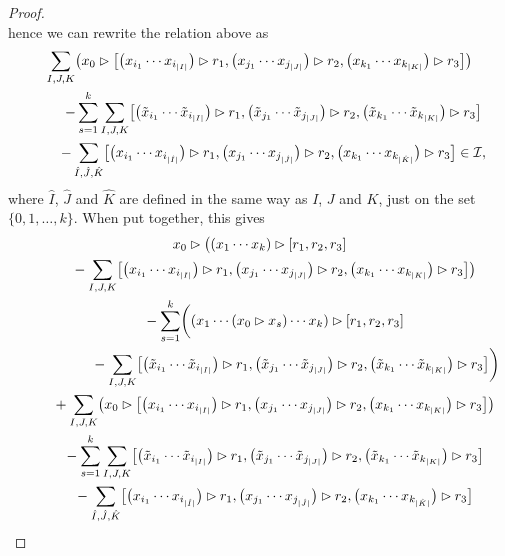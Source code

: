 \documentclass[10pt,a4paper]{amsart}
\numberwithin{equation}{section}
\begin{document}
\begin{proof}
\[\]
hence we can rewrite the relation above as
\begin{gather*}
 \sum_{I,J,K} \bigl( x_0 \rhd \bigl[\bigl(x_{i_1} \cdots x_{i_{|I|}}\bigr) \rhd r_1, \bigl(x_{j_1} \cdots x_{j_{|J|}}\bigr) \rhd r_2, \bigl(x_{k_1} \cdots x_{k_{|K|}}\bigr) \rhd r_3\bigr] \bigr)\\
 \qquad - \sum_{s=1}^k \sum_{I,J,K} \bigl[\bigl(\Tilde{x}_{i_1} \cdots \Tilde{x}_{i_{|I|}}\bigr) \rhd r_1, \bigl(\Tilde{x}_{j_1} \cdots \Tilde{x}_{j_{|J|}}\bigr) \rhd r_2, \bigl(\Tilde{x}_{k_1} \cdots \Tilde{x}_{k_{|K|}}\bigr) \rhd r_3\bigr] \\
 \qquad - \sum_{\hat{I},\hat{J},\hat{K}} \bigl[\bigl(x_{i_1} \cdots x_{i_{|\hat{I}|}}\bigr) \rhd r_1, \bigl(x_{j_1} \cdots x_{j_{|\hat{J}|}}\bigr) \rhd r_2, \bigl(x_{k_1} \cdots x_{k_{|\hat{K}|}}\bigr) \rhd r_3\bigr] \in \mathcal{I},
\end{gather*}
where $\hat{I}$, $\hat{J}$ and $\hat{K}$ are defined in the same way as $I$, $J$ and $K$, just on the set $\{0, 1, \dots ,k \}$. When put together, this gives
\begin{gather*}
 x_0 \rhd \bigl( (x_1 \cdots x_k) \rhd [r_1, r_2, r_3] \\
 \qquad {}- \sum_{I,J,K} \bigl[\bigl(x_{i_1} \cdots x_{i_{|I|}}\bigr) \rhd r_1, \bigl(x_{j_1} \cdots x_{j_{|J|}}\bigr) \rhd r_2, \bigl(x_{k_1} \cdots x_{k_{|K|}}\bigr) \rhd r_3\bigr] \bigr) \\
 \qquad {}- \sum_{s=1}^k \biggl( (x_1 \cdots (x_0 \rhd x_s) \cdots x_k) \rhd [r_1, r_2, r_3] \\
 \qquad {}\hphantom{- \sum_{s=1}^k \biggl(}{}- \sum_{I,J,K} \bigl[\bigl(\Tilde{x}_{i_1} \cdots \Tilde{x}_{i_{|I|}}\bigr) \rhd r_1, \bigl(\Tilde{x}_{j_1} \cdots \Tilde{x}_{j_{|J|}}\bigr) \rhd r_2, \bigl(\Tilde{x}_{k_1} \cdots \Tilde{x}_{k_{|K|}}\bigr) \rhd r_3\bigr] \biggr) \\
 \qquad {}+ \sum_{I,J,K} \bigl( x_0 \rhd \bigl[\bigl(x_{i_1} \cdots x_{i_{|I|}}\bigr) \rhd r_1, \bigl(x_{j_1} \cdots x_{j_{|J|}}\bigr) \rhd r_2, \bigl(x_{k_1} \cdots x_{k_{|K|}}\bigr) \rhd r_3\bigr] \bigr)\\
 \qquad {}- \sum_{s=1}^k \sum_{I,J,K} \bigl[\bigl(\Tilde{x}_{i_1} \cdots \Tilde{x}_{i_{|I|}}\bigr) \rhd r_1, \bigl(\Tilde{x}_{j_1} \cdots \Tilde{x}_{j_{|J|}}\bigr) \rhd r_2, \bigl(\Tilde{x}_{k_1} \cdots \Tilde{x}_{k_{|K|}}\bigr) \rhd r_3\bigr] \\
 \qquad {}- \sum_{\hat{I},\hat{J},\hat{K}} \bigl[\bigl(x_{i_1} \cdots x_{i_{|\hat{I}|}}\bigr) \rhd r_1, \bigl(x_{j_1} \cdots x_{j_{|\hat{J}|}}\bigr) \rhd r_2, \bigl(x_{k_1} \cdots x_{k_{|\hat{K}|}}\bigr) \rhd r_3\bigr] \\

\end{gather*}
\end{proof}
\end{document}
